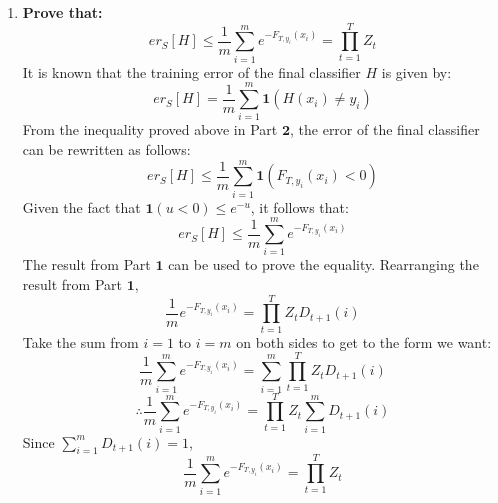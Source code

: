 \documentclass[english]{article}
\begin{document}
\begin{enumerate}
    \item \textbf{Prove that:} $$er_S[H] \leq \frac{1}{m} \sum_{i=1}^{m} e^{-F_{T,y_i}(x_i)} = \prod_{t=1}^{T} Z_t$$
    It is known that the training error of the final classifier $H$ is given by: 
    $$er_S[H] = \frac{1}{m} \sum_{i=1}^{m} \textbf{1}(H(x_i) \neq y_i)$$
    From the inequality proved above in Part $\mathbf{2}$, the error of the final classifier can be rewritten as follows:
    $$er_S[H] \leq \frac{1}{m} \sum_{i=1}^{m} \textbf{1}(F_{T,y_i}(x_i) < 0)$$ Given the fact that $\textbf{1}(u < 0) \leq e^{-u}$, it follows that:
    $$er_S[H] \leq \frac{1}{m} \sum_{i=1}^{m} e^{-F_{T,y_i}(x_i)}$$
    The result from Part $\mathbf{1}$ can be used to prove the equality. Rearranging the result from Part $\mathbf{1}$,
     $$\frac{1}{m} e^{-F_{T,y_i}(x_i)} = \prod_{t=1}^{T} Z_t D_{t+1}(i)$$ 
    Take the sum from $i = 1$ to $i = m$ on both sides to get to the form we want: $$\frac{1}{m}\sum_{i=1}^{m} e^{-F_{T,y_i}(x_i)} = \sum_{i=1}^{m}\prod_{t=1}^{T} Z_t D_{t+1}(i)$$
    $$\therefore \frac{1}{m}\sum_{i=1}^{m} e^{-F_{T,y_i}(x_i)} = \prod_{t=1}^{T} Z_t \sum_{i=1}^{m} D_{t+1}(i)$$
    Since $\sum_{i=1}^{m} D_{t+1}(i) = 1$,
    $$\frac{1}{m}\sum_{i=1}^{m} e^{-F_{T,y_i}(x_i)} = \prod_{t=1}^{T} Z_t $$
    

\end{enumerate}
\end{document}
